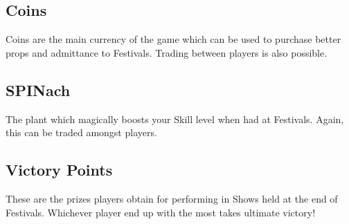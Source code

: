 		\subsection{Coins}
Coins are the main currency of the game which can be used to purchase better props and admittance to Festivals.
Trading between players is also possible.
		\subsection{SPINach}
The plant which magically boosts your Skill level when had at Festivals.
Again, this can be traded amongst players.
		\subsection{Victory Points}
These are the prizes players obtain for performing in Shows held at the end of Festivals.
Whichever player end up with the most takes ultimate victory!
